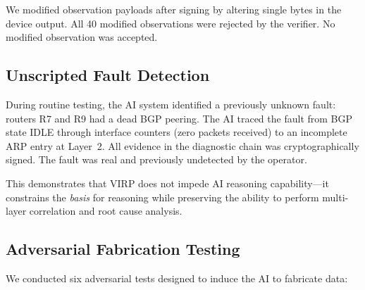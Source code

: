 \documentclass[11pt,twocolumn]{article}
\begin{document}
We modified observation payloads after signing by altering single bytes in the device output. All 40 modified observations were rejected by the verifier. No modified observation was accepted.

\subsection{Unscripted Fault Detection}

During routine testing, the AI system identified a previously unknown fault: routers R7 and R9 had a dead BGP peering. The AI traced the fault from BGP state IDLE through interface counters (zero packets received) to an incomplete ARP entry at Layer~2. All evidence in the diagnostic chain was cryptographically signed. The fault was real and previously undetected by the operator.

This demonstrates that VIRP does not impede AI reasoning capability---it constrains the \textit{basis} for reasoning while preserving the ability to perform multi-layer correlation and root cause analysis.

\subsection{Adversarial Fabrication Testing}

We conducted six adversarial tests designed to induce the AI to fabricate data:
\end{document}
